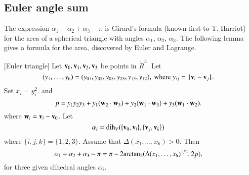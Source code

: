 \subsection{Euler angle sum}

The expression $\alpha_1+\alpha_2+\alpha_3-\pi$ is Girard's
formula (known first to T. Harriot) 
for the area of a spherical triangle with angles
$\alpha_1$, $\alpha_2$, $\alpha_3$.  The following lemma
gives a formula for the area, discovered by
Euler and Lagrange.
%
%
%
%
%

\begin{lemma}[Euler triangle]\label{lemma:euler}
Let ${\mathbf v}_0,{\mathbf v}_1,{\mathbf v}_2,{\mathbf v}_3$ be points in $\ring{R}^3$. 
Let 
  $$(y_1,\ldots,y_6) =(y_{01},y_{02},y_{03},y_{23},y_{13},y_{12}),
   \text{ where } y_{ij}={\hskip0.1em|\hskip-0.15em|\hskip0.1em}{\mathbf v}_i - {\mathbf v}_j{\hskip0.1em|\hskip-0.15em|\hskip0.1em}.$$
Set
$x_i = y_i^2$.   
and
    $$
    p = y_1 y_2 y_3 + y_1 ({\mathbf w}_2\cdot {\mathbf w}_3) + y_2 ({\mathbf w}_1\cdot {\mathbf w}_3) + y_3
    ({\mathbf w}_1\cdot {\mathbf w}_2).
    $$
%
where ${\mathbf w}_i = {\mathbf v}_i- {\mathbf v}_0$.
Let $$\alpha_i =\operatorname{dih}_V(\{{\mathbf v}_0,{\mathbf v}_i\},\{{\mathbf v}_j,{\mathbf v}_k\})$$
where $\{i,j,k\}=\{1,2,3\}$.
Assume that $\Delta(x_1,\ldots,x_6)>0$. 
Then
    $$
    \alpha_1+\alpha_2+\alpha_3 - \pi
     = {\pi} - 2{\operatorname{arctan_2}}({\Delta(x_1,\ldots,x_6)^{1/2}},{2 p}),
    $$
for three given dihedral angles $\alpha_i$.
\end{lemma}
%

